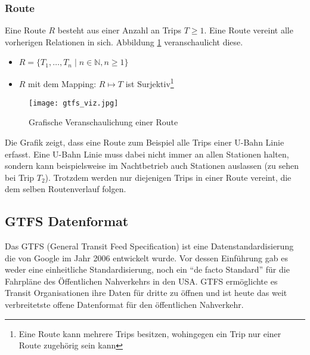 \begin{newpage}

    \subsubsection{Route}
    \label{ssub:route}
      Eine Route $R$ besteht aus einer Anzahl an Trips $T \geq 1$. Eine Route vereint alle vorherigen Relationen in sich. Abbildung \ref{fig:gtfs_viz} veranschaulicht diese. 

      \begin{itemize}
        \item $R = \{ T_1, \dotsc, T_n \;|\; n \in \mathbb{N}, n \geq 1 \}$

        \item $R$ mit dem Mapping: $R \mapsto T$ ist Surjektiv\footnote{Eine Route kann mehrere Trips besitzen, wohingegen ein Trip nur einer Route zugehörig sein kann} 
      \end{itemize}     

      \begin{figure}[htbp]
        \begin{center}
          \texttt{[image: gtfs\_viz.jpg]}
          \caption{Grafische Veranschaulichung einer Route}
          \label{fig:gtfs_viz}
        \end{center}
      \end{figure}

      Die Grafik zeigt, dass eine Route zum Beispiel alle Trips einer U-Bahn Linie erfasst. Eine U-Bahn Linie muss dabei nicht immer an allen Stationen halten, sondern kann beispielsweise im Nachtbetrieb auch Stationen auslassen (zu sehen bei Trip $T_2$). Trotzdem werden nur diejenigen Trips in einer Route vereint, die dem selben Routenverlauf folgen.
      


	\subsection{GTFS Datenformat}
	\label{ssec:gtfs_datenformat}
		Das GTFS (General Transit Feed Specification) ist eine Datenstandardisierung die von Google im Jahr 2006 entwickelt wurde. Vor dessen Einführung gab es weder eine einheitliche Standardisierung, noch ein "`de facto Standard"' für die Fahrpläne des Öffentlichen Nahverkehrs in den USA. GTFS ermöglichte es Transit Organisationen ihre Daten für dritte zu öffnen und ist heute das weit verbreitetste offene Datenformat für den öffentlichen Nahverkehr.\parencite[S. 2]{roush}\\


\end{newpage}
